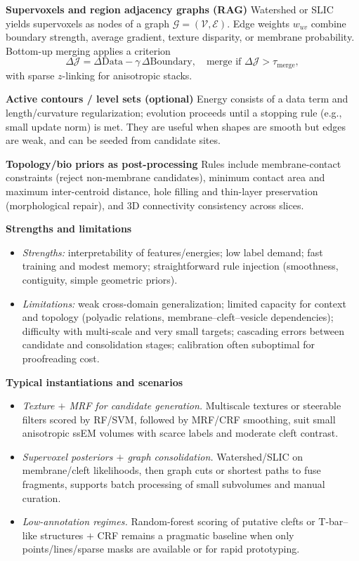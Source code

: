\medskip
\noindent\textbf{Supervoxels and region adjacency graphs (RAG)}\;
Watershed or SLIC yields supervoxels as nodes of a graph \(\mathcal G=(\mathcal V,\mathcal E)\).
Edge weights \(w_{uv}\) combine boundary strength, average gradient, texture disparity, or membrane probability.
Bottom-up merging applies a criterion
\[
\Delta \mathcal J=\Delta\mathrm{Data}-\gamma\,\Delta\mathrm{Boundary},
\quad \text{merge if }\Delta \mathcal J>\tau_{\text{merge}},
\]
with sparse \(z\)-linking for anisotropic stacks.

\medskip
\noindent\textbf{Active contours / level sets (optional)}\;
Energy consists of a data term and length/curvature regularization; evolution proceeds until a stopping rule (e.g., small update norm) is met.
They are useful when shapes are smooth but edges are weak, and can be seeded from candidate sites.

\medskip
\noindent\textbf{Topology/bio priors as post-processing}\;
Rules include membrane-contact constraints (reject non-membrane candidates), minimum contact area and maximum inter-centroid distance, hole filling and thin-layer preservation (morphological repair), and 3D connectivity consistency across slices.

\medskip
\noindent\textbf{Strengths and limitations}\;
\begin{itemize}\setlength\itemsep{0.25em}
  \item \emph{Strengths:} interpretability of features/energies; low label demand; fast training and modest memory; straightforward rule injection (smoothness, contiguity, simple geometric priors).
  \item \emph{Limitations:} weak cross-domain generalization; limited capacity for context and topology (polyadic relations, membrane–cleft–vesicle dependencies); difficulty with multi-scale and very small targets; cascading errors between candidate and consolidation stages; calibration often suboptimal for proofreading cost.
\end{itemize}

\medskip
\noindent\textbf{Typical instantiations and scenarios}\;
\begin{itemize}\setlength\itemsep{0.25em}
  \item \emph{Texture \(+\) MRF for candidate generation.} Multiscale textures or steerable filters scored by RF/SVM, followed by MRF/CRF smoothing, suit small anisotropic ssEM volumes with scarce labels and moderate cleft contrast.
  \item \emph{Supervoxel posteriors \(+\) graph consolidation.} Watershed/SLIC on membrane/cleft likelihoods, then graph cuts or shortest paths to fuse fragments, supports batch processing of small subvolumes and manual curation.
  \item \emph{Low-annotation regimes.} Random-forest scoring of putative clefts or T-bar–like structures \(+\) CRF remains a pragmatic baseline when only points/lines/sparse masks are available or for rapid prototyping.
\end{itemize}

